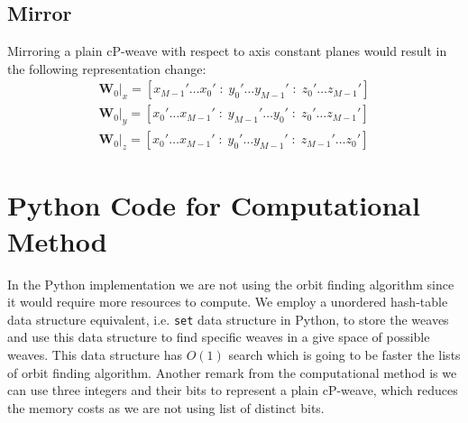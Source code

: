 \documentclass[unnumsec,webpdf,contemporary,large]{oup-authoring-template}%
\theoremstyle{thmstyleone}%
\theoremstyle{thmstyletwo}%
\theoremstyle{thmstylethree}%
\begin{document}
\subsection*{Mirror}
Mirroring a plain cP-weave with respect to axis constant planes would result in the following representation change:
\begin{align*}
    \mathbf{W}_0|_x=[x_{M-1}'\dots x_0'\;:\;y_0'\dots y_{M-1}'\;:\;z_0'\dots z_{M-1}']\\
    \mathbf{W}_0|_y=[x_0'\dots x_{M-1}'\;:\;y_{M-1}'\dots y_0'\;:\;z_0'\dots z_{M-1}']\\
    \mathbf{W}_0|_z=[x_0'\dots x_{M-1}' \;:\;y_0'\dots y_{M-1}'\;:\;z_{M-1}'\dots z_0']
\end{align*}

\newpage
\section*{Python Code for Computational Method}

In the Python implementation we are not using the orbit finding algorithm since it would require more resources to compute. We employ a unordered hash-table data structure equivalent, i.e. \verb|set| data structure in Python, to store the weaves and use this data structure to find specific weaves in a give space of possible weaves. This data structure has $O(1)$ search which is going to be faster the lists of orbit finding algorithm. Another remark from the computational method is we can use three integers and their bits to represent a plain cP-weave, which reduces the memory costs as we are not using list of distinct bits.
\end{document}
